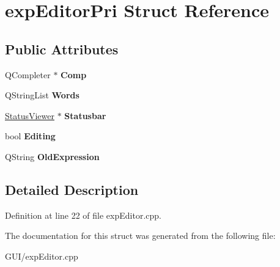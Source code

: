 \hypertarget{structexp_editor_pri}{}\section{exp\+Editor\+Pri Struct Reference}
\label{structexp_editor_pri}
\subsection*{Public Attributes}
\begin{DoxyCompactItemize}
\item 
\mbox{\label{structexp_editor_pri_a975cde226d64ee9dabf8d87c20c23a9d}} 
Q\+Completer $\ast$ {\bfseries Comp}
\item 
\mbox{\label{structexp_editor_pri_abe463148278c8b592817d89114d0736a}} 
Q\+String\+List {\bfseries Words}
\item 
\mbox{\label{structexp_editor_pri_a0580488eb7460ee5364c3b5255f4dd07}} 
\hyperlink{class_status_viewer}{Status\+Viewer} $\ast$ {\bfseries Statusbar}
\item 
\mbox{\label{structexp_editor_pri_af9b774f0651594f1e16d9190d28da0a4}} 
bool {\bfseries Editing}
\item 
\mbox{\label{structexp_editor_pri_a34a8bb8f9f74465afc5d96d7af59bde8}} 
Q\+String {\bfseries Old\+Expression}
\end{DoxyCompactItemize}


\subsection{Detailed Description}


Definition at line 22 of file exp\+Editor.\+cpp.



The documentation for this struct was generated from the following file\+:\begin{DoxyCompactItemize}
\item 
G\+U\+I/exp\+Editor.\+cpp\end{DoxyCompactItemize}
